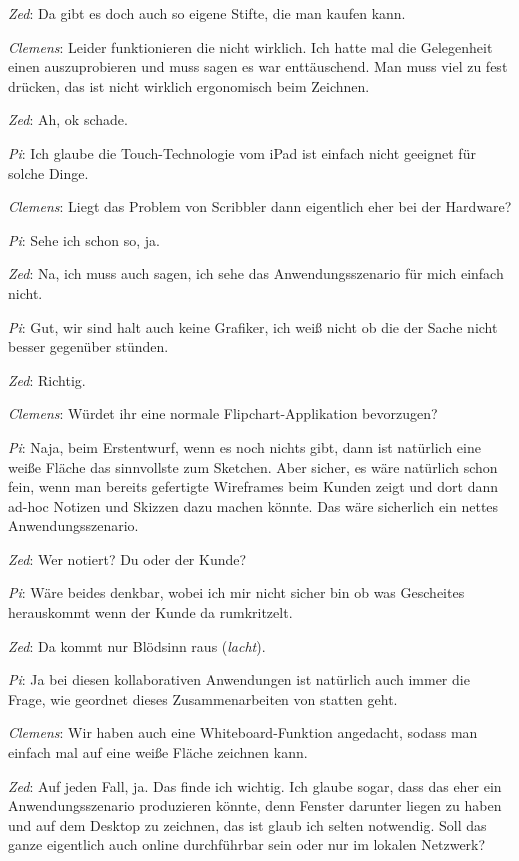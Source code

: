 \medskip \emph{Zed}: Da gibt es doch auch so eigene Stifte, die man kaufen kann.

\medskip \emph{Clemens}: Leider funktionieren die nicht wirklich. Ich hatte mal die Gelegenheit einen auszuprobieren und muss sagen es war enttäuschend. Man muss viel zu fest drücken, das ist nicht wirklich ergonomisch beim Zeichnen.

\medskip \emph{Zed}: Ah, ok schade.

\medskip \emph{Pi}: Ich glaube die Touch-Technologie vom iPad ist einfach nicht geeignet für solche Dinge.

\medskip \emph{Clemens}: Liegt das Problem von Scribbler dann eigentlich eher bei der Hardware?

\medskip \emph{Pi}: Sehe ich schon so, ja.

\medskip \emph{Zed}: Na, ich muss auch sagen, ich sehe das Anwendungsszenario für mich einfach nicht.

\medskip \emph{Pi}: Gut, wir sind halt auch keine Grafiker, ich weiß nicht ob die der Sache nicht besser gegenüber stünden.

\medskip \emph{Zed}: Richtig.

\medskip \emph{Clemens}: Würdet ihr eine normale Flipchart-Applikation bevorzugen?

\medskip \emph{Pi}: Naja, beim Erstentwurf, wenn es noch nichts gibt, dann ist natürlich eine weiße Fläche das sinnvollste zum Sketchen. Aber sicher, es wäre natürlich schon fein, wenn man bereits gefertigte Wireframes beim Kunden zeigt und dort dann ad-hoc Notizen und Skizzen dazu machen könnte. Das wäre sicherlich ein nettes Anwendungsszenario.

\medskip \emph{Zed}: Wer notiert? Du oder der Kunde?

\medskip \emph{Pi}: Wäre beides denkbar, wobei ich mir nicht sicher bin ob was Gescheites herauskommt wenn der Kunde da rumkritzelt.

\medskip \emph{Zed}: Da kommt nur Blödsinn raus (\emph{lacht}).

\medskip \emph{Pi}: Ja bei diesen kollaborativen Anwendungen ist natürlich auch immer die Frage, wie geordnet dieses Zusammenarbeiten von statten geht. 

\medskip \emph{Clemens}: Wir haben auch eine Whiteboard-Funktion angedacht, sodass man einfach mal auf eine weiße Fläche zeichnen kann.

\medskip \emph{Zed}: Auf jeden Fall, ja. Das finde ich wichtig. Ich glaube sogar, dass das eher ein Anwendungsszenario produzieren könnte, denn Fenster darunter liegen zu haben und auf dem Desktop zu zeichnen, das ist glaub ich selten notwendig. Soll das ganze eigentlich auch online durchführbar sein oder nur im lokalen Netzwerk?

